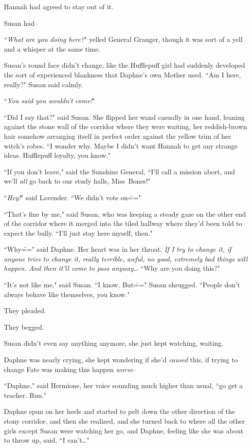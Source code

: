 Hannah had agreed to stay out of it.

Susan had\---

\later

``\emph{What are you doing here?}" yelled General Granger, though it was sort of a yell and a whisper at the same time.

Susan's round face didn't change, like the Hufflepuff girl had suddenly developed the sort of experienced blankness that Daphne's own Mother used. ``Am I here, really?" Susan said calmly.

``\emph{You said you wouldn't come!}"

``Did I say that?" said Susan. She flipped her wand casually in one hand, leaning against the stone wall of the corridor where they were waiting, her reddish-brown hair somehow arranging itself in perfect order against the yellow trim of her witch's robes. ``I wonder why. Maybe I didn't want Hannah to get any strange ideas. Hufflepuff loyalty, you know."

``If you don't leave," said the Sunshine General, ``I'll call a mission abort, and we'll \emph{all} go back to our study halls, Miss~Bones!"

``\emph{Hey!}" said Lavender. ``We didn't vote on\==="

``That's fine by me," said Susan, who was keeping a steady gaze on the other end of the corridor where it merged into the tiled hallway where they'd been told to expect the bully. ``I'll just stay here myself, then."

``Why\===" said Daphne. Her heart was in her throat. \emph{If I try to change it, if \emph{anyone} tries to change it, really terrible, awful, no good, extremely bad things will happen. And then it'll come to pass anyway{\ldots}} ``Why are you doing this?"

``It's not like me," said Susan. ``I know. But\===" Susan shrugged. ``People don't always behave like themselves, you know."

They pleaded.

They begged.

Susan didn't even say anything anymore, she just kept watching, waiting.

Daphne was nearly crying, she kept wondering if she'd \emph{caused} this, if trying to change Fate was making this happen \emph{worse}\---

``Daphne," said Hermione, her voice sounding much higher than usual, ``go get a teacher. Run."

Daphne spun on her heels and started to pelt down the other direction of the stony corridor, and then she realized, and she turned back to where all the other girls except Susan were watching her go, and Daphne, feeling like she was about to throw up, said, ``I can't{\ldots}"

